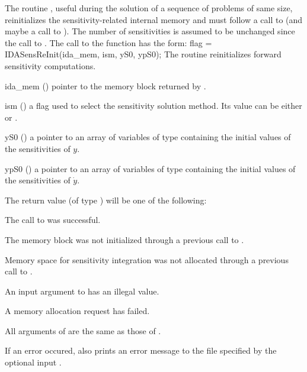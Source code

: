 The routine , useful during the solution of a sequence of problems of 
same size, reinitializes the sensitivity-related internal memory 
and must follow a call to  (and maybe a call to ). 
The number  of sensitivities is assumed to be unchanged since the call to 
.
The call to the  function has the form:
{
  flag = IDASensReInit(ida\_mem, ism, yS0, ypS0);
}
{
  The routine  reinitializes forward sensitivity computations.
}
{
  \begin{args}

  \item[ida\_mem] ()
    pointer to the {\idas} memory block returned by .

  \item[ism] ()
    a flag used to select the sensitivity solution method.  Its value can 
    be either  or .
  \item[yS0] () 
    a pointer to an array of  variables of type  containing the 
    initial values of the sensitivities of $y$.
  \item[ypS0] () 
    a pointer to an array of  variables of type  containing the 
    initial values of the sensitivities of $\dot{y}$.
  \end{args}
}
{
  The return value  (of type ) will be one of the following:
  \begin{args}
  \item[\Id{IDA\_SUCCESS}]
    The call to  was successful.
  \item[\Id{IDA\_MEM\_NULL}] 
    The {\idas} memory block was not initialized through a 
    previous call to .
  \item[\Id{IDA\_NO\_SENS}]
    Memory space for sensitivity integration was not allocated through a 
    previous call to .
  \item[\Id{IDA\_ILL\_INPUT}] 
    An input argument to  has an illegal value.    
  \item[\Id{IDA\_MEM\_FAIL}] 
    A memory allocation request has failed.
  \end{args}
}
{
  All arguments of  are the same as those of
  .

  If an error occured,  also prints an error message to the
  file specified by the optional input .
}
